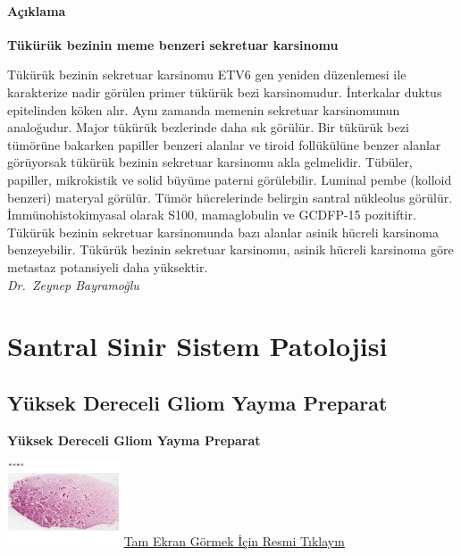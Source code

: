 \documentclass[
  letterpaper,
  DIV=11,
  numbers=noendperiod]{scrreprt}
\begin{document}
\hypertarget{auxe7ux131klama}{%
\subsection{Açıklama}\label{auxe7ux131klama}}

\textbf{Tükürük bezinin meme benzeri sekretuar karsinomu}

Tükürük bezinin sekretuar karsinomu ETV6 gen yeniden düzenlemesi ile
karakterize nadir görülen primer tükürük bezi karsinomudur. İnterkalar
duktus epitelinden köken alır. Aynı zamanda memenin sekretuar
karsinomunun analoğudur. Major tükürük bezlerinde daha sık görülür. Bir
tükürük bezi tümörüne bakarken papiller benzeri alanlar ve tiroid
follükülüne benzer alanlar görüyorsak tükürük bezinin sekretuar
karsinomu akla gelmelidir. Tübüler, papiller, mikrokistik ve solid
büyüme paterni görülebilir. Luminal pembe (kolloid benzeri) materyal
görülür. Tümör hücrelerinde belirgin santral nükleolus görülür.
İmmünohistokimyasal olarak S100, mamaglobulin ve GCDFP-15 pozitiftir.
Tükürük bezinin sekretuar karsinomunda bazı alanlar asinik hücreli
karsinoma benzeyebilir. Tükürük bezinin sekretuar karsinomu, asinik
hücreli karsinoma göre metastaz potansiyeli daha yüksektir.\\
\emph{Dr.~Zeynep Bayramoğlu}

\part{Santral Sinir Sistem Patolojisi}

\hypertarget{sec-yuksek-dereceli-gliom-yayma-preparat}{%
\chapter{Yüksek Dereceli Gliom Yayma
Preparat}\label{sec-yuksek-dereceli-gliom-yayma-preparat}}

\textbf{Yüksek Dereceli Gliom Yayma Preparat}

\href{https://images.patolojiatlasi.com/high-grade-glioma-squash/HE.html}{\includegraphics[width=0.25\textwidth,height=\textheight]{./screenshots/high-grade-glioma-squash_screenshot.png}}
\href{https://images.patolojiatlasi.com/high-grade-glioma-squash/HE.html}{Tam
Ekran Görmek İçin Resmi Tıklayın}
\end{document}
